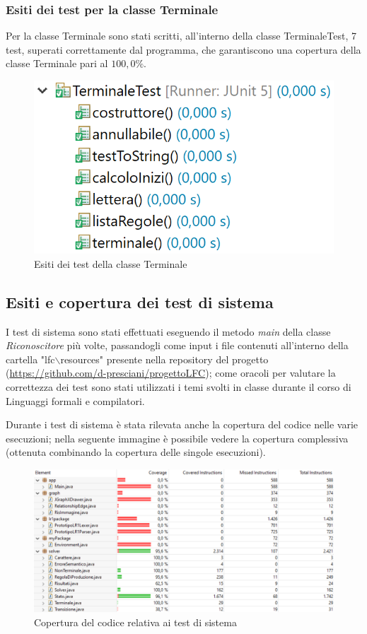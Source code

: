 \documentclass[12pt]{article}
\begin{document}
\subsubsection{Esiti dei test per la classe Terminale}
Per la classe Terminale sono stati scritti, all'interno della classe TerminaleTest, 7 test, superati correttamente dal programma, che garantiscono una copertura della classe Terminale pari al $100,0\%$.
\begin{figure}[h]
\centering
\includegraphics[scale=0.4]{immagini/esitiTerminaleTest.png}
\caption{Esiti dei test della classe Terminale}
\end{figure}
\pagebreak
\subsection{Esiti e copertura dei test di sistema}
I test di sistema sono stati effettuati eseguendo il metodo \textit{main} della classe \textit{Riconoscitore} più volte, passandogli come input i file contenuti all'interno della cartella "lfc$\backslash$resources" presente nella repository del progetto (\url{https://github.com/d-presciani/progettoLFC}); come oracoli per valutare la correttezza dei test sono stati utilizzati i temi svolti in classe durante il corso di Linguaggi formali e compilatori. \par
Durante i test di sistema è stata rilevata anche la copertura del codice nelle varie esecuzioni; nella seguente immagine è possibile vedere la copertura complessiva (ottenuta combinando la copertura delle singole esecuzioni).
\begin{figure}[h]
\centering
\includegraphics[width=\textwidth]{immagini/codeCoverage.png}
\caption{Copertura del codice relativa ai test di sistema}
\end{figure}
\end{document}
